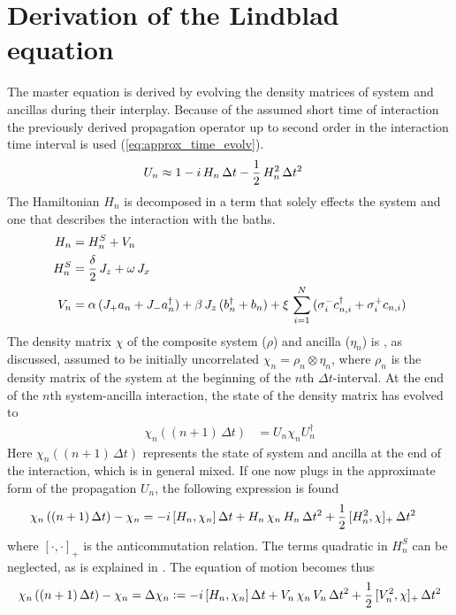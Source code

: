 \section{Derivation of the Lindblad equation}%
The master equation is derived by evolving the density matrices of system and ancillas during their interplay. Because of the assumed short time of interaction the previously derived propagation operator up to second order in the interaction time interval is used (\ref{eq:approx_time_evolv}).
\begin{align}
    U_n &\approx 1-i\,H_n \,\Delta t-\frac{1}{2}\,H_n^2\,\Delta t^2
\end{align}
The Hamiltonian $H_n$ is decomposed in a term that solely effects the system and one that describes the interaction with the baths.
\begin{align}\label{eq:Ham_split}
    H_n &= H_n^S + V_n\notag\\
    H_n^S&=\frac{\delta}{2}\,J_z+\omega\,J_x\notag\\
    V_n&= \alpha\,(J_+a_n + J_-a_n^\dagger)+ \beta\,J_z\,(b_n^\dagger+b_n)+\xi\,\sum_{i=1}^N\,(\sigma_{i}^-c_{n,i}^\dagger+\sigma_i^+c_{n,i})
\end{align}
The density matrix $\chi$ of the composite system ($\rho$) and ancilla ($\eta_n$) is , as discussed, assumed to be initially uncorrelated $\chi_n=\rho_n\otimes\eta_n$, where $\rho_n$ is the density matrix of the system at the beginning of the $n$th $\Delta t$-interval. At the end of the $n$th system-ancilla interaction, the state of the density matrix has evolved to
\begin{align*}
    \chi_n\left((n+1)\,\Delta t\right)&=U_n\chi_nU_n^\dagger
\end{align*}
Here $ \chi_n((n+1)\,\Delta t)$ represents the state of system and ancilla at the end of the interaction, which is in general mixed.
If one now plugs in the approximate form of the propagation $U_n$, the following expression is found
\begin{align*}
    \chi_n\left((n+1)\,\Delta t\right)-\chi_n&=-i\,[H_n,\chi_n]\,\Delta t+H_n\,\chi_n\,H_n\,\Delta t^2+\frac{1}{2}\,[H_n^2,\chi]_+\,\Delta t^2
\end{align*}
where $[\cdot,\cdot]_+$ is the anticommutation relation. The terms quadratic in $H_n^S$ can be neglected, as is explained in \cite{ciccarello_quantum_2022}. The equation of motion becomes thus
\begin{align}
    \chi_n\left((n+1)\,\Delta t\right)-\chi_n=\Delta\chi_n\vcentcolon=-i\,[H_n,\chi_n]\,\Delta t+V_n\,\chi_n\,V_n\,\Delta t^2+\frac{1}{2}\,[V_n^2,\chi]_+\,\Delta t^2\label{eq:pre_lindblad}
\end{align}
